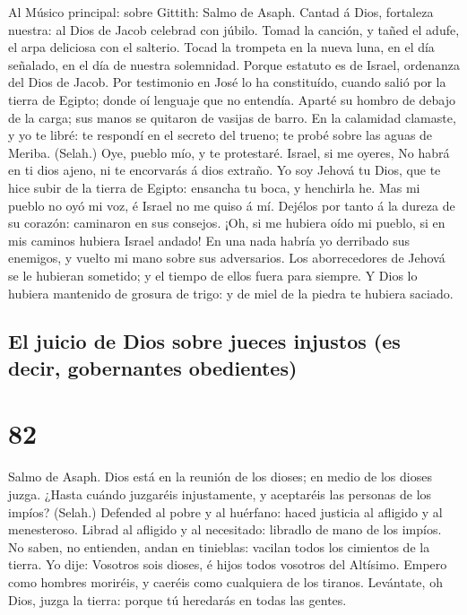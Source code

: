  Al Músico principal: sobre Gittith: Salmo de Asaph.
Cantad á Dios, fortaleza nuestra: al Dios de Jacob celebrad con júbilo.
 Tomad la canción, y tañed el adufe, el arpa deliciosa con
el salterio.  Tocad la trompeta en la nueva luna, en el
día señalado, en el día de nuestra solemnidad.  Porque
estatuto es de Israel, ordenanza del Dios de Jacob.  Por
testimonio en José lo ha constituído, cuando salió por la tierra de
Egipto; donde oí lenguaje que no entendía.  Aparté su
hombro de debajo de la carga; sus manos se quitaron de vasijas de barro.
 En la calamidad clamaste, y yo te libré: te respondí en
el secreto del trueno; te probé sobre las aguas de Meriba. (Selah.)
 Oye, pueblo mío, y te protestaré. Israel, si me oyeres,
 No habrá en ti dios ajeno, ni te encorvarás á dios
extraño.  Yo soy Jehová tu Dios, que te hice subir de la
tierra de Egipto: ensancha tu boca, y henchirla he.  Mas
mi pueblo no oyó mi voz, é Israel no me quiso á mí. 
Dejélos por tanto á la dureza de su corazón: caminaron en sus consejos.
 ¡Oh, si me hubiera oído mi pueblo, si en mis caminos
hubiera Israel andado!  En una nada habría yo derribado
sus enemigos, y vuelto mi mano sobre sus adversarios. 
Los aborrecedores de Jehová se le hubieran sometido; y el tiempo de
ellos fuera para siempre.  Y Dios lo hubiera mantenido de
grosura de trigo: y de miel de la piedra te hubiera saciado.

\hypertarget{el-juicio-de-dios-sobre-jueces-injustos-es-decir-gobernantes-obedientes}{%
\subsection{El juicio de Dios sobre jueces injustos (es decir,
gobernantes
obedientes)}\label{el-juicio-de-dios-sobre-jueces-injustos-es-decir-gobernantes-obedientes}}

\hypertarget{section-81}{%
\section{82}\label{section-81}}

 Salmo de Asaph. Dios está en la reunión de los dioses; en
medio de los dioses juzga.  ¿Hasta cuándo juzgaréis
injustamente, y aceptaréis las personas de los impíos? (Selah.)
 Defended al pobre y al huérfano: haced justicia al
afligido y al menesteroso.  Librad al afligido y al
necesitado: libradlo de mano de los impíos.  No saben, no
entienden, andan en tinieblas: vacilan todos los cimientos de la tierra.
 Yo dije: Vosotros sois dioses, é hijos todos vosotros del
Altísimo.  Empero como hombres moriréis, y caeréis como
cualquiera de los tiranos.  Levántate, oh Dios, juzga la
tierra: porque tú heredarás en todas las gentes.

